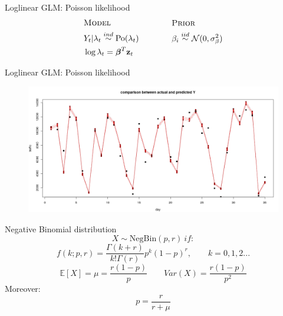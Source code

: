 \documentclass{beamer}
\begin{document}
\begin{frame}{Loglinear GLM: Poisson likelihood}
\begin{equation*}
\begin{aligned}
&\textsc{Model}\\
&Y_t  |  \lambda_t \overset{ind}{\sim} \mathrm{Po}(\lambda_t)\\
&\log{\lambda_t} = \boldsymbol{\beta}^T\mathbf{z}_t\\
\end{aligned}
\qquad \qquad
\begin{aligned}[c]
&\textsc{Prior}\\
&\beta_i \overset{iid}{\sim}\mathcal{N}(0,\sigma^2_\beta)\\
&\\
\end{aligned}
\end{equation*}
\end{frame}

\begin{frame}{Loglinear GLM: Poisson likelihood}
\begin{figure}[H]
\centering
\includegraphics[width=1\linewidth]{pictures/poiss_y.png} 
\end{figure}
\end{frame}

\begin{frame}{Negative Binomial distribution}
$$X \sim \mathrm{NegBin}(p,r) \ if:$$
$$f(k;p,r) = \frac{\Gamma(k+r)}{k!\Gamma(r)} p^k (1-p)^r, \qquad k = 0,1,2...$$
$$\mathbb{E}[X] = \mu = \frac{r(1-p)}{p} \qquad Var(X) = \frac{r(1-p)}{p^2}$$
Moreover:
$$p = \frac{r}{r+\mu}$$
\end{frame}
\end{document}
